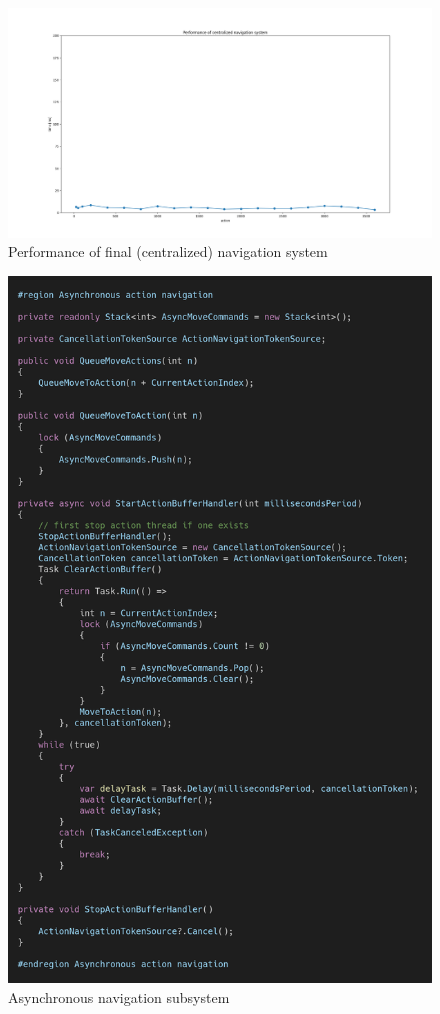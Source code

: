 \begin{figure}
\centering
\includegraphics[width=\textwidth]{figures/pyplot/performance_navsystem-central.png}
\caption{Performance of final (centralized) navigation system}
\label{fig:navsystem.performance.central}
\end{figure}

\begin{figure}
\centering
\includegraphics[width=\textwidth]{figures/code/nav-arch/async-navigation.png}
\caption{Asynchronous navigation subsystem}
\label{fig:async.navigation}
\end{figure}

